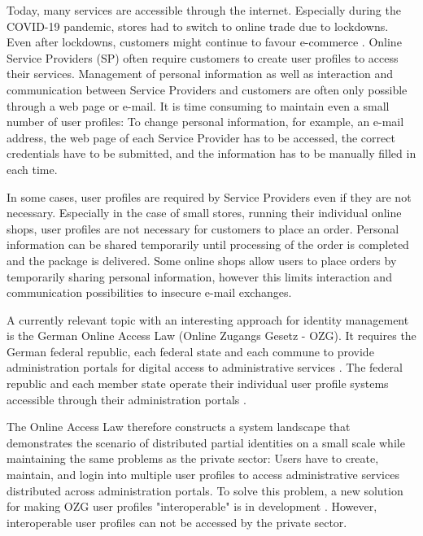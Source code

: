 Today, many services are accessible through the internet. Especially during the COVID-19 pandemic, stores had to switch to online trade due to lockdowns. Even after lockdowns, customers might continue to favour e-commerce \cite{9076858}. Online Service Providers (SP) often require customers to create user profiles to access their services. Management of personal information as well as interaction and communication between Service Providers and customers are often only possible through a web page or e-mail. It is time consuming to maintain even a small number of user profiles: To change personal information, for example, an e-mail address, the web page of each Service Provider has to be accessed, the correct credentials have to be submitted, and the information has to be manually filled in each time.

In some cases, user profiles are required by Service Providers even if they are not necessary. Especially in the case of small stores, running their individual online shops, user profiles are not necessary for customers to place an order. Personal information can be shared temporarily until processing of the order is completed and the package is delivered. Some online shops allow users to place orders by temporarily sharing personal information, however this limits interaction and communication possibilities to insecure e-mail exchanges.

A currently relevant topic with an interesting approach for identity management is the German Online Access Law (Online Zugangs Gesetz - OZG). It requires the German federal republic, each federal state and each commune to provide administration portals for digital access to administrative services \cite{ozg:general}. The federal republic and each member state operate their individual user profile systems accessible through their administration portals \cite{ozg:user_profiles_general}. 

The Online Access Law therefore constructs a system landscape that demonstrates the scenario of distributed partial identities on a small scale while maintaining the same problems as the private sector: Users have to create, maintain, and login into multiple user profiles to access administrative services distributed across administration portals. To solve this problem, a new solution for making OZG user profiles "interoperable" is in development \cite{ozg:user_profiles_general}. However, interoperable user profiles can not be accessed by the private sector.

